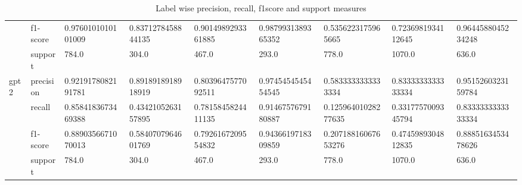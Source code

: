 \begin{landscape}
\begin{table}[]
{\begin{tabular}{@{}lllllllll@{}}
\multicolumn{1}{|l|}{} &
  \multicolumn{1}{l|}{f1-score} &
  \multicolumn{1}{l|}{0.9760101010101009} &
  \multicolumn{1}{l|}{0.8371278458844135} &
  \multicolumn{1}{l|}{0.9014989293361885} &
  \multicolumn{1}{l|}{0.9879931389365352} &
  \multicolumn{1}{l|}{0.5356223175965665} &
  \multicolumn{1}{l|}{0.7236981934112645} &
  \multicolumn{1}{l|}{0.9644588045234248} \\ \cmidrule(l){2-9} 
\multicolumn{1}{|l|}{} &
  \multicolumn{1}{l|}{support} &
  \multicolumn{1}{l|}{784.0} &
  \multicolumn{1}{l|}{304.0} &
  \multicolumn{1}{l|}{467.0} &
  \multicolumn{1}{l|}{293.0} &
  \multicolumn{1}{l|}{778.0} &
  \multicolumn{1}{l|}{1070.0} &
  \multicolumn{1}{l|}{636.0} \\ \midrule
\multicolumn{1}{|l|}{\multirow{4}{*}{gpt2}} &
  \multicolumn{1}{l|}{precision} &
  \multicolumn{1}{l|}{0.9219178082191781} &
  \multicolumn{1}{l|}{0.8918918918918919} &
  \multicolumn{1}{l|}{0.8039647577092511} &
  \multicolumn{1}{l|}{0.9745454545454545} &
  \multicolumn{1}{l|}{0.5833333333333334} &
  \multicolumn{1}{l|}{0.8333333333333334} &
  \multicolumn{1}{l|}{0.9515260323159784} \\ \cmidrule(l){2-9} 
\multicolumn{1}{|l|}{} &
  \multicolumn{1}{l|}{recall} &
  \multicolumn{1}{l|}{0.8584183673469388} &
  \multicolumn{1}{l|}{0.4342105263157895} &
  \multicolumn{1}{l|}{0.7815845824411135} &
  \multicolumn{1}{l|}{0.9146757679180887} &
  \multicolumn{1}{l|}{0.12596401028277635} &
  \multicolumn{1}{l|}{0.3317757009345794} &
  \multicolumn{1}{l|}{0.8333333333333334} \\ \cmidrule(l){2-9} 
\multicolumn{1}{|l|}{} &
  \multicolumn{1}{l|}{f1-score} &
  \multicolumn{1}{l|}{0.8890356671070013} &
  \multicolumn{1}{l|}{0.5840707964601769} &
  \multicolumn{1}{l|}{0.7926167209554832} &
  \multicolumn{1}{l|}{0.9436619718309859} &
  \multicolumn{1}{l|}{0.20718816067653276} &
  \multicolumn{1}{l|}{0.4745989304812835} &
  \multicolumn{1}{l|}{0.8885163453478626} \\ \cmidrule(l){2-9} 
\multicolumn{1}{|l|}{} &
  \multicolumn{1}{l|}{support} &
  \multicolumn{1}{l|}{784.0} &
  \multicolumn{1}{l|}{304.0} &
  \multicolumn{1}{l|}{467.0} &
  \multicolumn{1}{l|}{293.0} &
  \multicolumn{1}{l|}{778.0} &
  \multicolumn{1}{l|}{1070.0} &
  \multicolumn{1}{l|}{636.0} \\ \bottomrule
\end{tabular}%
}
\caption{Label wise precision, recall, f1score and support measures}
\label{tab:Per-Label-precision-recall-f-measure}
\end{table}
\end{landscape}

